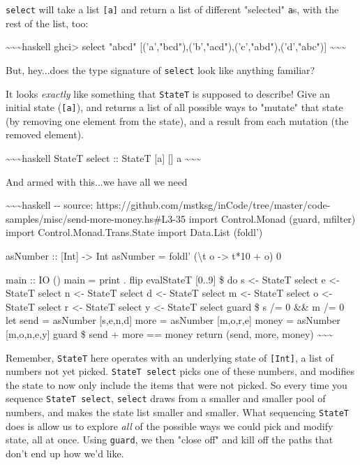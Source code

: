 \documentclass[]{article}
\begin{document}
\texttt{select} will take a list \texttt{{[}a{]}} and return a list of different
"selected" \texttt{a}s, with the rest of the list, too:

\textasciitilde{}\textasciitilde{}\textasciitilde{}haskell ghci\textgreater{}
select "abcd" {[}('a',"bcd"),('b',"acd"),('c',"abd"),('d',"abc"){]}
\textasciitilde{}\textasciitilde{}\textasciitilde{}

But, hey...does the type signature of \texttt{select} look like anything
familiar?

It looks \emph{exactly} like something that \texttt{StateT} is supposed to
describe! Give an initial state (\texttt{{[}a{]}}), and returns a list of all
possible ways to "mutate" that state (by removing one element from the state),
and a result from each mutation (the removed element).

\textasciitilde{}\textasciitilde{}\textasciitilde{}haskell StateT select ::
StateT {[}a{]} {[}{]} a \textasciitilde{}\textasciitilde{}\textasciitilde{}

And armed with this...we have all we need

\textasciitilde{}\textasciitilde{}\textasciitilde{}haskell -\/- source:
https://github.com/mstksg/inCode/tree/master/code-samples/misc/send-more-money.hs\#L3-35
import Control.Monad (guard, mfilter) import Control.Monad.Trans.State import
Data.List (foldl')

asNumber :: {[}Int{]} -\textgreater{} Int asNumber = foldl' (\textbackslash{}t o
-\textgreater{} t*10 + o) 0

main :: IO () main = print . flip evalStateT {[}0..9{]} \$ do s \textless{}-
StateT select e \textless{}- StateT select n \textless{}- StateT select d
\textless{}- StateT select m \textless{}- StateT select o \textless{}- StateT
select r \textless{}- StateT select y \textless{}- StateT select guard \$ s /= 0
\&\& m /= 0 let send = asNumber {[}s,e,n,d{]} more = asNumber {[}m,o,r,e{]}
money = asNumber {[}m,o,n,e,y{]} guard \$ send + more == money return (send,
more, money) \textasciitilde{}\textasciitilde{}\textasciitilde{}

Remember, \texttt{StateT} here operates with an underlying state of
\texttt{{[}Int{]}}, a list of numbers not yet picked. \texttt{StateT\ select}
picks one of these numbers, and modifies the state to now only include the items
that were not picked. So every time you sequence \texttt{StateT\ select},
\texttt{select} draws from a smaller and smaller pool of numbers, and makes the
state list smaller and smaller. What sequencing \texttt{StateT} does is allow us
to explore \emph{all} of the possible ways we could pick and modify state, all
at once. Using \texttt{guard}, we then "close off" and kill off the paths that
don't end up how we'd like.
\end{document}
